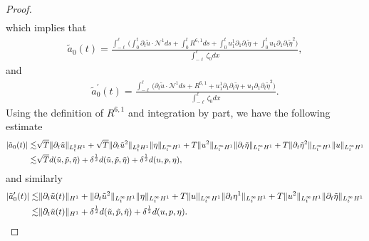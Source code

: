 \documentclass[letterpaper,reqno,10pt,twoside]{amsart}
\theoremstyle{definition}
\theoremstyle{remark}
\def\p{\partial}
\begin{document}
\begin{proof}
\begin{align}
			\end{align}
			\noindent which implies that
			\begin{align}
				\tilde{a}_{0}(t)=\frac{\int_{-\ell}^{\ell}\big( \int_{0}^{t}\p_{t}\tilde{u}\cdot \mathcal{N}^{1}ds+\int_{0}^{t}R^{6,1}ds+\int_{0}^{t}u_{1}^{1}\p_{1}\p_{t}\tilde{\eta}+\int_{0}^{t}u_{1}\p_{1}\p_{t}\tilde{\eta}^{2}\big)}{\int_{-\ell}^{\ell}\zeta_{0}dx},
			\end{align}
			\noindent and
			\begin{align}
				\tilde{a}_{0}^{\prime}(t)=\frac{\int_{-\ell}^{\ell}\big( \p_{t}\tilde{u}\cdot \mathcal{N}^{1}ds+R^{6,1}+u_{1}^{1}\p_{1}\p_{t}\tilde{\eta}+u_{1}\p_{1}\p_{t}\tilde{\eta}^{2}\big)}{\int_{-\ell}^{\ell}\zeta_{0}dx}.
			\end{align}
			\noindent Using the definition of $R^{6,1}$ and integration by part, we have the following estimate
			\begin{align}
				|\tilde{a}_{0}(t)|\lesssim &\sqrt{T}\|\p_{t}\tilde{u}\|_{L_{t}^{2}H^{1}}+\sqrt{T}\|\p_{t}\tilde{u}^{2}\|_{L_{t}^{2}H^{1}}\|\eta\|_{L_{t}^{\infty}H^{1}}+T\|u^{2}\|_{L_{t}^{\infty}H^{1}}\|\p_{t}\tilde{\eta}\|_{L_{t}^{\infty}H^{1}}+T\|\p_{t}\tilde{\eta}^{2}\|_{L_{t}^{\infty}H^{1}}\|u\|_{L_{t}^{\infty}H^{1}}\notag\\
				\lesssim&\sqrt{T}d(\tilde{u},\tilde{p},\tilde{\eta})+\delta^{\frac{1}{2}}d(\tilde{u},\tilde{p},\tilde{\eta})+\delta^{\frac{1}{2}} d({u},{p},{\eta}),
			\end{align}
			\noindent and similarly
			\begin{align}
				|\tilde{a}^{\prime}_{0}(t)|\lesssim &\|\p_{t}\tilde{u}(t)\|_{H^{1}}+\|\p_{t}\tilde{u}^{2}\|_{L_{t}^{\infty}H^{1}}\|\eta\|_{L_{t}^{\infty}H^{1}}+T\|u\|_{L_{t}^{\infty}H^{1}}\|\p_{t}\eta^{1}\|_{L_{t}^{\infty}H^{1}}+T\|u^{2}\|_{L_{t}^{\infty}H^{1}}\|\p_{t}\tilde{\eta}\|_{L_{t}^{\infty}H^{1}}\notag\\
				\lesssim&\|\p_{t}\tilde{u}(t)\|_{H^{1}}+\delta^{\frac{1}{2}}d(\tilde{u},\tilde{p},\tilde{\eta})+\delta^{\frac{1}{2}}d({u},{p},{\eta}).
			\end{align}
			

\end{proof}
\end{document}
